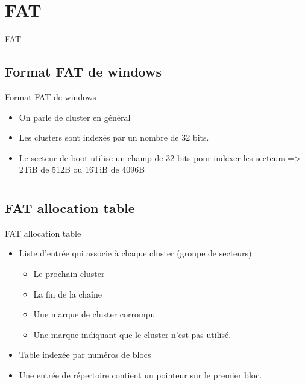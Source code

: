 \def\sectitle{FAT}
\section{\sectitle}
\begin{frame}{\sectitle}
\def\subsectitle{Format FAT de windows}
\subsection{\subsectitle}
\begin{block}{\subsectitle}
\begin{itemize}
    \item On parle de cluster en général
    \item Les clusters sont indexés par un nombre de 32 bits.
    \item Le secteur de boot utilise un champ de 32 bits pour indexer les
        secteurs => 2TiB de 512B ou 16TiB de 4096B
\end{itemize}
\end{block}
\end{frame}


\def\sectitle{}
\section{\sectitle}
\begin{frame}{\sectitle}
\def\subsectitle{FAT allocation table}
\subsection{\subsectitle}
\begin{block}{\subsectitle}
\begin{itemize}
    \item Liste d'entrée qui associe à chaque cluster (groupe de secteurs):
        \begin{itemize}
            \item Le prochain cluster
            \item La fin de la chaîne
            \item Une marque de cluster corrompu
            \item Une marque indiquant que le cluster n'est pas utilisé.
        \end{itemize}
    \item Table indexée par numéros de blocs
    \item Une entrée de répertoire contient un pointeur sur le premier bloc.
\end{itemize}
\end{block}
\end{frame}



